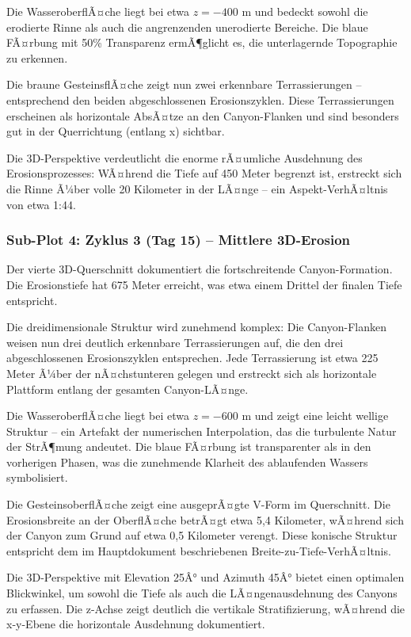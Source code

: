 Die WasseroberflÃ¤che liegt bei etwa $z = -400$ m und bedeckt sowohl die erodierte Rinne als auch die angrenzenden unerodierte Bereiche. Die blaue FÃ¤rbung mit 50\% Transparenz ermÃ¶glicht es, die unterlagernde Topographie zu erkennen.

Die braune GesteinsflÃ¤che zeigt nun zwei erkennbare Terrassierungen -- entsprechend den beiden abgeschlossenen Erosionszyklen. Diese Terrassierungen erscheinen als horizontale AbsÃ¤tze an den Canyon-Flanken und sind besonders gut in der Querrichtung (entlang x) sichtbar.

Die 3D-Perspektive verdeutlicht die enorme rÃ¤umliche Ausdehnung des Erosionsprozesses: WÃ¤hrend die Tiefe auf 450 Meter begrenzt ist, erstreckt sich die Rinne Ã¼ber volle 20 Kilometer in der LÃ¤nge -- ein Aspekt-VerhÃ¤ltnis von etwa 1:44.

\subsubsection*{Sub-Plot 4: Zyklus 3 (Tag 15) -- Mittlere 3D-Erosion}

Der vierte 3D-Querschnitt dokumentiert die fortschreitende Canyon-Formation. Die Erosionstiefe hat 675 Meter erreicht, was etwa einem Drittel der finalen Tiefe entspricht.

Die dreidimensionale Struktur wird zunehmend komplex: Die Canyon-Flanken weisen nun drei deutlich erkennbare Terrassierungen auf, die den drei abgeschlossenen Erosionszyklen entsprechen. Jede Terrassierung ist etwa 225 Meter Ã¼ber der nÃ¤chstunteren gelegen und erstreckt sich als horizontale Plattform entlang der gesamten Canyon-LÃ¤nge.

Die WasseroberflÃ¤che liegt bei etwa $z = -600$ m und zeigt eine leicht wellige Struktur -- ein Artefakt der numerischen Interpolation, das die turbulente Natur der StrÃ¶mung andeutet. Die blaue FÃ¤rbung ist transparenter als in den vorherigen Phasen, was die zunehmende Klarheit des ablaufenden Wassers symbolisiert.

Die GesteinsoberflÃ¤che zeigt eine ausgeprÃ¤gte V-Form im Querschnitt. Die Erosionsbreite an der OberflÃ¤che betrÃ¤gt etwa 5,4 Kilometer, wÃ¤hrend sich der Canyon zum Grund auf etwa 0,5 Kilometer verengt. Diese konische Struktur entspricht dem im Hauptdokument beschriebenen Breite-zu-Tiefe-VerhÃ¤ltnis.

Die 3D-Perspektive mit Elevation 25Â° und Azimuth 45Â° bietet einen optimalen Blickwinkel, um sowohl die Tiefe als auch die LÃ¤ngenausdehnung des Canyons zu erfassen. Die z-Achse zeigt deutlich die vertikale Stratifizierung, wÃ¤hrend die x-y-Ebene die horizontale Ausdehnung dokumentiert.

